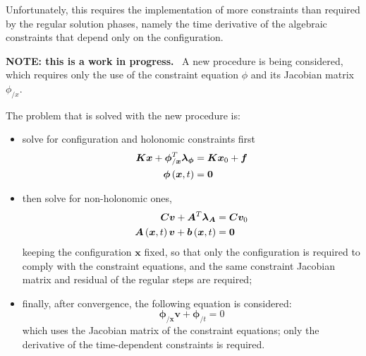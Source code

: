 \documentclass[10pt,dvips,fleqn,subeqn]{report}
\newcommand{\T}[1]{\bm{#1}}
\newcommand{\TT}[1]{\bm{#1}}
\begin{document}
Unfortunately, this requires the implementation of more constraints
than required by the regular solution phases, namely the time derivative
of the algebraic constraints that depend only on the configuration.


\textbf{NOTE: this is a work in progress.} \
A new procedure is being considered, which requires only the use 
of the constraint equation $\phi$ and its Jacobian matrix $\phi_{/x}$.

The problem that is solved with the new procedure is:
\begin{itemize}
\item solve for configuration and holonomic constraints first
\begin{align}
	\TT{K} \T{x} + \T{\phi}_{/\T{x}}^T \T{\lambda}_{\T{\phi}}
		& = \TT{K} \T{x}_0 + \T{f} \\
	\T{\phi}\plbr{\T{x}, t} & = \T{0}
\end{align}

\item then solve for non-holonomic ones,
\begin{align}
	\TT{C} \T{v} + \TT{A}^T \T{\lambda}_{\TT{A}} & = \TT{C} \T{v}_0 \\
	\TT{A}\plbr{\T{x}, t} \T{v} + \T{b}\plbr{\T{x}, t} & = \T{0}
\end{align}
keeping the configuration $\T{x}$ fixed,
so that only the configuration is required to comply 
with the constraint equations, and the same constraint 
Jacobian matrix and residual of the regular steps are required;

\item
finally, after convergence, the following equation is considered:
\begin{equation}
	\T{\phi}_{/\T{x}} \T{v} + \T{\phi}_{/t} = 0
\end{equation}
which uses the Jacobian matrix of the constraint equations; 
only the derivative of the time-dependent constraints is required.


\end{itemize}
\end{document}
